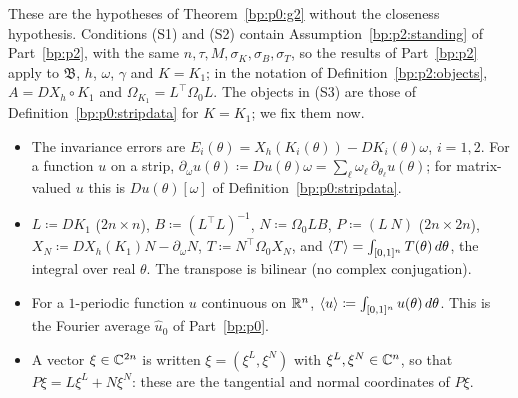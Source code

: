 These are the hypotheses of Theorem~\ref{bp:p0:g2} without the closeness hypothesis. Conditions (S1)
and (S2) contain Assumption~\ref{bp:p2:standing} of Part~\ref{bp:p2}, with the same
$n,\tau,M,\sigma_K,\sigma_B,\sigma_T$, so the results of Part~\ref{bp:p2} apply to $\mathfrak B$, $h$, $\omega$,
$\gamma$ and $K=K_1$; in the notation of Definition~\ref{bp:p2:objects}, $A=DX_h\circ K_1$ and
$\Omega_{K_1}=L^\top\Omega_0L$. The objects in (S3) are those of Definition~\ref{bp:p0:stripdata} for
$K=K_1$; we fix them now.
\begin{itemize}
\item The invariance errors are $E_i(\theta)=X_h(K_i(\theta))-DK_i(\theta)\omega$, $i=1,2$. For a
  function $u$ on a strip, $\partial_\omega u(\theta)\coloneqq Du(\theta)\omega=\sum_\ell\omega_\ell\,
  \partial_{\theta_\ell}u(\theta)$; for matrix-valued $u$ this is $Du(\theta)[\omega]$ of
  Definition~\ref{bp:p0:stripdata}.
\item $L\coloneqq DK_1$ ($2n\times n$), $B\coloneqq(L^\top L)^{-1}$, $N\coloneqq\Omega_0LB$,
  $P\coloneqq(L\ N)$ ($2n\times2n$), $X_N\coloneqq DX_h(K_1)N-\partial_\omega N$,
  $T\coloneqq N^\top\Omega_0X_N$, and $\langle T\rangle=\int_{[0,1]^n}T(\theta)\,d\theta$, the integral over real
  $\theta$. The transpose is bilinear (no complex conjugation).
\item For a $1$-periodic function $u$ continuous on $\mathbb{R}^n$, $\langle u\rangle\coloneqq\int_{[0,1]^n}u(\theta)\,
  d\theta$. This is the Fourier average $\hat u_0$ of Part~\ref{bp:p0}.
\item A vector $\xi\in\mathbb{C}^{2n}$ is written $\xi=(\xi^L,\xi^N)$ with $\xi^L,\xi^N\in\mathbb{C}^n$, so that
  $P\xi=L\xi^L+N\xi^N$: these are the tangential and normal coordinates of $P\xi$.
\end{itemize}

